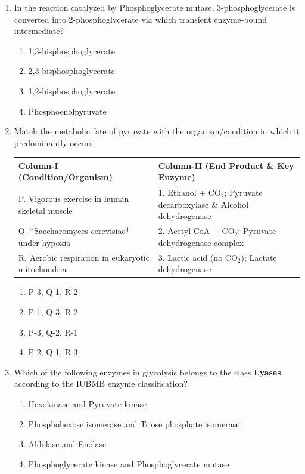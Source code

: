 \documentclass[11pt, a4paper]{article}
\begin{document}
\begin{enumerate}[label=\textbf{\arabic*.}]
\item In the reaction catalyzed by Phosphoglycerate mutase, 3-phosphoglycerate is converted into 2-phosphoglycerate via which transient enzyme-bound intermediate?
\begin{enumerate}[label=(\Alph*)]
    \item 1,3-bisphosphoglycerate
    \item 2,3-bisphosphoglycerate
    \item 1,2-bisphosphoglycerate
    \item Phosphoenolpyruvate
\end{enumerate}

\item Match the metabolic fate of pyruvate with the organism/condition in which it predominantly occurs:
\begin{center}
\begin{tabular}{|l|l|}
\hline
\textbf{Column-I (Condition/Organism)} & \textbf{Column-II (End Product \& Key Enzyme)} \\
\hline
P. Vigorous exercise in human skeletal muscle & 1. Ethanol + $\text{CO}_2$; Pyruvate decarboxylase \& Alcohol dehydrogenase \\
Q. *Saccharomyces cerevisiae* under hypoxia & 2. Acetyl-CoA + $\text{CO}_2$; Pyruvate dehydrogenase complex \\
R. Aerobic respiration in eukaryotic mitochondria & 3. Lactic acid (no $\text{CO}_2$); Lactate dehydrogenase \\
\hline
\end{tabular}
\end{center}
\begin{enumerate}[label=(\Alph*)]
    \item P-3, Q-1, R-2
    \item P-1, Q-3, R-2
    \item P-3, Q-2, R-1
    \item P-2, Q-1, R-3
\end{enumerate}

\item Which of the following enzymes in glycolysis belongs to the class \textbf{Lyases} according to the IUBMB enzyme classification?
\begin{enumerate}[label=(\Alph*)]
    \item Hexokinase and Pyruvate kinase
    \item Phosphohexose isomerase and Triose phosphate isomerase
    \item Aldolase and Enolase
    \item Phosphoglycerate kinase and Phosphoglycerate mutase
\end{enumerate}


\end{enumerate}
\end{document}
